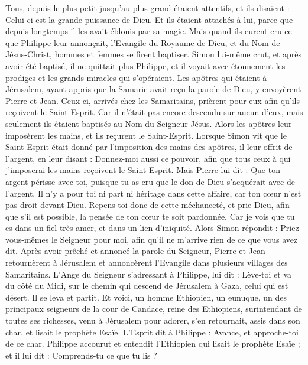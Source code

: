 \begin{multicols}{2}
Tous, depuis le plus petit jusqu’au plus grand étaient attentifs, et ils disaient : Celui-ci est la grande puissance de Dieu.
Et ils étaient attachés à lui, parce que depuis longtemps il les avait éblouis par sa magie.
Mais quand ils eurent cru ce que Philippe leur annonçait, l’Evangile du Royaume de Dieu, et du Nom de Jésus-Christ, hommes et femmes se firent baptiser.
Simon lui-même crut, et après avoir été baptisé, il ne quittait plus Philippe, et il voyait avec étonnement les prodiges et les grands miracles qui s’opéraient.
Les apôtres qui étaient à Jérusalem, ayant appris que la Samarie avait reçu la parole de Dieu, y envoyèrent Pierre et Jean.
Ceux-ci, arrivés chez les Samaritains, prièrent pour eux afin qu'ils reçoivent le Saint-Esprit.
Car il n'était pas encore descendu sur aucun d'eux, mais seulement ils étaient baptisés au Nom du Seigneur Jésus.
Alors les apôtres leur imposèrent les mains, et ils reçurent le Saint-Esprit.
Lorsque Simon vit que le Saint-Esprit était donné par l'imposition des mains des apôtres, il leur offrit de l'argent,
en leur disant : Donnez-moi aussi ce pouvoir, afin que tous ceux à qui j'imposerai les mains reçoivent le Saint-Esprit.
Mais Pierre lui dit : Que ton argent périsse avec toi, puisque tu as cru que le don de Dieu s'acquérait avec de l'argent.
Il n’y a pour toi ni part ni héritage dans cette affaire, car ton cœur n'est pas droit devant Dieu.
Repens-toi donc de cette méchanceté, et prie Dieu, afin que s'il est possible, la pensée de ton cœur te soit pardonnée.
Car je vois que tu es dans un fiel très amer, et dans un lien d'iniquité.
Alors Simon répondit : Priez vous-mêmes le Seigneur pour moi, afin qu’il ne m’arrive rien de ce que vous avez dit.
Après avoir prêché et annoncé la parole du Seigneur, Pierre et Jean retournèrent à Jérusalem et annoncèrent l'Evangile dans plusieurs villages des Samaritains.
L’Ange du Seigneur s’adressant à Philippe, lui dit : Lève-toi et va du côté du Midi, sur le chemin qui descend de Jérusalem à Gaza, celui qui est désert.
Il se leva et partit. Et voici, un homme Ethiopien, un eunuque, un des principaux seigneurs de la cour de Candace, reine des Ethiopiens, surintendant de toutes ses richesses, venu à Jérusalem pour adorer,
s’en retournait, assis dans son char, et lisait le prophète Esaïe.
L'Esprit dit à Philippe : Avance, et approche-toi de ce char.
Philippe accourut et entendit l’Ethiopien qui lisait le prophète Esaïe ; et il lui dit : Comprends-tu ce que tu lis ?

\end{multicols}
